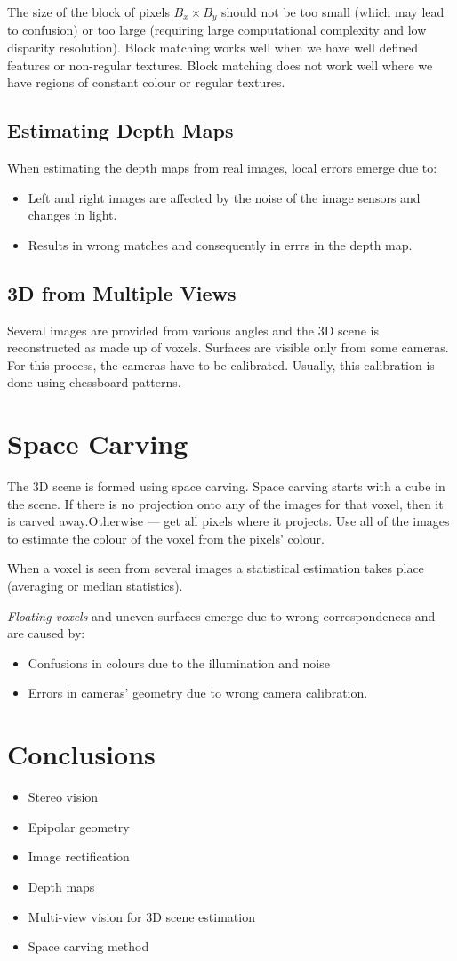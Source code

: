 \documentclass{article}
\begin{document}
The size of the block of pixels $B_x \times B_y$ should not be too small (which may lead to confusion) or too large (requiring large computational complexity and low disparity resolution).
Block matching works well when we have well defined features or non-regular textures.
Block matching does not work well where we have regions of constant colour or regular textures.

\subsection{Estimating Depth Maps }
When estimating the depth maps from real images, local errors emerge due to:
\begin{itemize}
	\item Left and right images are affected by the noise of the image sensors and changes in light.
	\item Results in wrong matches and consequently in errrs in the depth map.
\end{itemize}

\subsection{3D from Multiple Views}
Several images are provided from various angles and the 3D scene is reconstructed as made up of voxels.
Surfaces are visible only from some cameras.
For this process, the cameras have to be calibrated.
Usually, this calibration is done using chessboard patterns.

\section{Space Carving}
The 3D scene is formed using space carving.
Space carving starts with a cube in the scene.
If there is no projection onto any of the images for that voxel, then it is carved away.Otherwise --- get all pixels where it projects.
Use all of the images to estimate the colour of the voxel from the pixels' colour.

When a voxel is seen from several images a statistical estimation takes place (averaging or median statistics).


\textit{Floating voxels} and uneven surfaces emerge due to wrong correspondences and are caused by:
\begin{itemize}
	\item Confusions in colours due to the illumination and noise
	\item Errors in cameras' geometry due to wrong camera calibration.
\end{itemize}

\section{Conclusions}
\begin{itemize}
	\item Stereo vision
	\item Epipolar geometry
	\item Image rectification
	\item Depth maps
	\item Multi-view vision for 3D scene estimation
	\item Space carving method
\end{itemize}
\end{document}
